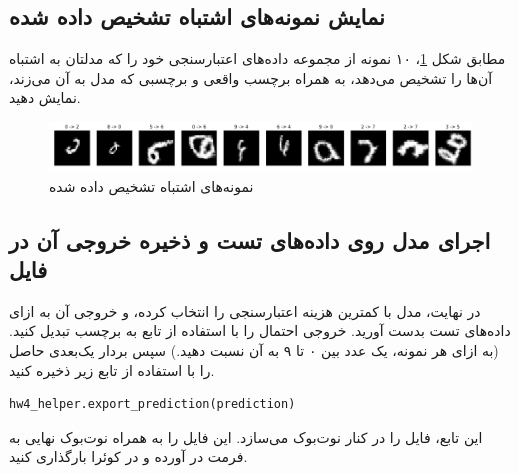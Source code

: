\documentclass{article}
\begin{document}
\subsection*{نمایش نمونه‌های اشتباه تشخیص داده شده}

مطابق شکل
\ref{fig:MisclassifiedSamples}،
۱۰ نمونه از مجموعه داده‌های اعتبارسنجی خود را که مدلتان به اشتباه آن‌ها را تشخیص می‌دهد، به همراه برچسب واقعی و برچسبی که مدل به آن می‌زند، نمایش دهید.

\begin{figure}[ht]
\begin{center}
\includegraphics[width=\linewidth]{images/MisclassifiedSamples.png}
\caption{نمونه‌های اشتباه تشخیص داده شده}
\label{fig:MisclassifiedSamples}
\end{center}
\end{figure}


\subsection*{اجرای مدل روی داده‌های تست و ذخیره خروجی آن در فایل}

در نهایت، مدل با کمترین هزینه اعتبارسنجی را انتخاب کرده، و خروجی آن به ازای داده‌های تست بدست آورید. خروجی احتمال را با استفاده از تابع
به برچسب تبدیل کنید. (به ازای هر نمونه،‌ یک عدد بین ۰ تا ۹ به آن نسبت دهید.) سپس بردار یک‌بعدی حاصل را با استفاده از تابع زیر ذخیره کنید.

\begin{latin}
\begin{lstlisting}[language=Python]
hw4_helper.export_prediction(prediction)
\end{lstlisting}
\end{latin}

این تابع، فایل 
را در کنار نوت‌بوک می‌سازد. این فایل را به همراه نوت‌بوک نهایی به فرمت
در آورده و در کوئرا بارگذاری کنید.
\end{document}
